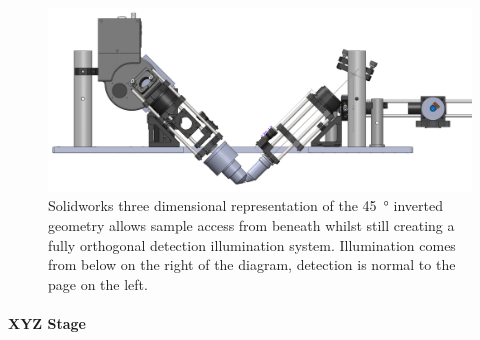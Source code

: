 \begin{figure}
\centering
\includegraphics[width=1\linewidth]{./Raster/solidworks_design_front}
\caption[CAD design of the \SI{45}{\degree} detection and illumination]{Solidworks three dimensional representation of the \SI{45}{\degree} inverted geometry allows sample access from beneath whilst still creating a fully orthogonal detection illumination system.
Illumination comes from below on the right of the diagram, detection is normal to the page on the left.}\label{fig:solidworks_design_front}
\end{figure}

\paragraph{XYZ Stage}

